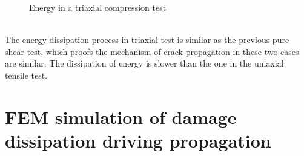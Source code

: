 \documentclass[preprint,review,12pt]{elsarticle}
\begin{document}
\begin{enumerate}
\begin{figure}[htbp]
{\begin{minipage}[b]{0.48\textwidth}
\end{minipage}}
\caption{Energy in a triaxial compression test}
\label{fig:CompressionEnergy}
\end{figure}
\
\\
The energy dissipation process in triaxial test is similar as the previous pure shear test, which proofs the mechanism of crack propagation in these two cases are similar. The dissipation of energy is slower than the one in the uniaxial tensile test.
\end{enumerate}

\section{FEM simulation of damage dissipation driving propagation}
\end{document}
